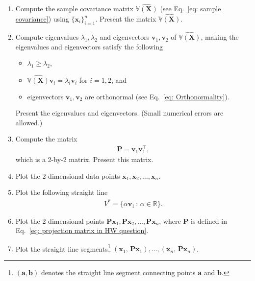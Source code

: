 \documentclass[11pt,letterpaper, leqno]{article}
\numberwithin{equation}{section}
\numberwithin{theorem}{section}
\numberwithin{lemma}{section}
\numberwithin{corollary}{section}
\numberwithin{definition}{section}
\numberwithin{proposition}{section}
\numberwithin{remark}{section}
\numberwithin{example}{section}
\newcommand{\T}{\intercal}
\begin{document}
\begin{enumerate}
\begin{enumerate}
        \item Compute the sample covariance matrix $\widehat{\mathbb{V}(\boldsymbol{X})}$ (see Eq.~\eqref{eq: sample covariance}) using $\{\boldsymbol{x}_i\}_{i=1}^n$. Present the matrix $\widehat{\mathbb{V}(\boldsymbol{X})}$.
        
        \item Compute eigenvalues $\lambda_1, \lambda_2$ and eigenvectors $\boldsymbol{v}_1, \boldsymbol{v}_2$ of $\widehat{\mathbb{V}(\boldsymbol{X})}$, making the eigenvalues and eigenvectors satisfy the following
        \begin{itemize}
            \item $\lambda_1\ge\lambda_2$,
            \item $\widehat{\mathbb{V}(\boldsymbol{X})}\boldsymbol{v}_i=\lambda_i \boldsymbol{v}_i$ for $i=1,2$, and 
            \item eigenvectors $\boldsymbol{v}_1, \boldsymbol{v}_2$ are orthonormal (see Eq.~\eqref{eq: Orthonormality}).
        \end{itemize}
        Present the eigenvalues and eigenvectors. (Small numerical errors are allowed.)
        \item Compute the matrix 
        \begin{align}\label{eq: projection matrix in HW question}
            \boldsymbol{P}=\boldsymbol{v}_1 \boldsymbol{v}_1^\T,
        \end{align}
        which is a 2-by-2 matrix. Present this matrix.
        \item Plot the 2-dimensional data points $\boldsymbol{x}_1,\boldsymbol{x}_2,\ldots,\boldsymbol{x}_n$.
        \item Plot the following straight line
        \begin{align}\label{eq: V star in HW question}
            V^*=\{\alpha \boldsymbol{v}_1 \,:\, \alpha\in\mathbb{R}\}.
        \end{align}
        \item Plot the 2-dimensional points $\boldsymbol{P}\boldsymbol{x}_1, \boldsymbol{P}\boldsymbol{x}_2,\ldots, \boldsymbol{P}\boldsymbol{x}_n$, where $\boldsymbol{P}$ is defined in Eq.~\eqref{eq: projection matrix in HW question}.
        \item Plot the straight line segments\footnote{$(\boldsymbol{a}, \boldsymbol{b})$ denotes the straight line segment connecting points $\boldsymbol{a}$ and $\boldsymbol{b}$.} $(\boldsymbol{x}_1,\, \boldsymbol{P}\boldsymbol{x}_1),\ldots, (\boldsymbol{x}_n,\, \boldsymbol{P}\boldsymbol{x}_n)$.

\end{enumerate}
\end{enumerate}
\end{document}
